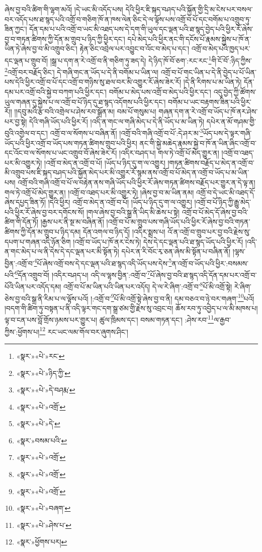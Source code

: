 ཞེས་བྱ་བའི་ཚིག་གི་ལྷག་མའོ། །དེ་ཡང་མི་འདོད་པས། དེའི་ཕྱིར་ཇི་སྐད་བཤད་པའི་སྐྱོན་གྱི་དྲི་མ་ངེས་པར་བསལ་བར་འདོད་པས་ཐ་སྙད་པའི་འགྲོ་བ་གཅིག་ཁོ་ན་ཁས་ལེན་ཅིང་དེ་ལ་ལྟོས་པས་འགྲོ་བ་པོ་དང་བགོམ་པ་འགྲུབ་ཏུ་ཟིན་ཀྱང་། དོན་དམ་པ་པའི་འགྲོ་བ་ཡང་མི་འཐད་པས་དེ་དག་གི་ཡུལ་དང་ལྡན་པའི་ཐ་སྙད་བྱེད་པའི་ཕྱིར་རོ་ཞེས་བྱ་བ་གཏན་ཚིགས་ཀྱི་དོན་མ་གྲུབ་པ་ཉིད་ཀྱི་ཕྱིར་དང་། དཔེ་མེད་པའི་ཕྱིར་ནང་གི་དངོས་པོ་རྣམས་སྐྱེས་པ་ཁོ་ན་ཡིན་ཏེ་ཞེས་བྱ་བ་མི་འགྲུབ་ཅིང་། རྟེན་ཅིང་འབྲེལ་པར་འབྱུང་བ་འོང་བ་མེད་པ་དང་། འགྲོ་བ་མེད་པའི་ཁྱད་པར་དང་ལྡན་པ་གྲུབ་བོ། །སྒྲ་པ་དག་ན་རེ་འགྲོ་བ་ནི་གཅིག་ཏུ་ཟད་དེ། དེ་ཉིད་ཁོ་བོ་ཅག་:རང་རང་\footnote{«སྣར་»«པེ་»རང་}གི་ངོ་བོ་:ཉིད་ཀྱིས་\footnote{«སྣར་»«པེ་»ཉིད་ཀྱི་}འགྲོ་བར་བརྗོད་ཅིང་། དེ་གཞི་གང་ན་ཡོད་པ་དེ་ནི་བགོམ་པ་ཡིན་ལ། འགྲོ་བ་པོ་གང་ཡིན་པ་དེ་ནི་བྱེད་པ་པོ་ཡིན་པས་དེའི་ཕྱིར་འགྲོ་བ་པོ་དང་འགྲོ་བ་གཉིས་སུ་ཐལ་བར་མི་འགྱུར་རོ་ཞེས་ཟེར་རོ། །དེ་ནི་རིགས་པ་མ་ཡིན་ཏེ། དོན་དམ་པར་འགྲོ་བའི་སྐྱེ་བ་བཀག་པའི་ཕྱིར་དང་། བགོམ་པ་མེད་པས་འགྲོ་བ་མེད་པའི་ཕྱིར་དང་། འདུ་བྱེད་ཀྱི་ཚོགས་ཡུལ་གཞན་དུ་སྐྱེས་པ་ལ་འགྲོ་བ་པོ་ཉིད་དུ་ཐ་སྙད་འདོགས་པའི་ཕྱིར་དང་། བགོམ་པ་ཡང་བརྟགས་ཟིན་པའི་ཕྱིར་རོ།། །།དབུ་མའི་རྩ་བའི་འགྲེལ་པ་ཤེས་རབ་སྒྲོན་མ། བམ་པོ་གསུམ་པ། གཞན་དག་ན་རེ་འགྲོ་བ་ཡོད་པ་ཁོ་ནར་ཤེས་པར་བྱ་སྟེ། དེའི་གཞི་ཡོད་པའི་ཕྱིར་རོ། །འདི་ན་གང་ལ་གཞི་མེད་པ་དེ་ནི་ཡོད་པ་མ་ཡིན་ཏེ། དཔེར་ན་མོ་གཤམ་གྱི་བུའི་འགྱེལ་བ་དང་། འགྲོ་བ་ལ་སོགས་པ་བཞིན་ནོ། །འགྲོ་བའི་གཞི་འགྲོ་བ་པོ་:དེ་ཤར་མ་\footnote{«སྣར་»«པེ་»དེ་བཤརྨ་}ཡོད་པས་དེ་ལྟར་གཞི་ཡོད་པའི་ཕྱིར་འགྲོ་བ་ཡོད་པས་གཏན་ཚིགས་གྲུབ་པའི་ཕྱིར། ནང་གི་སྐྱེ་མཆེད་རྣམས་སྐྱེ་བ་ཁོ་ན་ཡིན་ཞིང་འགྲོ་བ་དང་འོང་བ་ལ་སོགས་པ་ཡང་འགྲུབ་བོ་ཞེས་ཟེར་རོ། །འདིར་བཤད་པ། གལ་ཏེ་འགྲོ་པོ་མེད་གྱུར་ན། །འགྲོ་བ་འཐད་པར་མི་འགྱུར་ཏེ། །འགྲོ་བ་མེད་ན་འགྲོ་བ་པོ། །ཡོད་པ་ཉིད་དུ་ག་ལ་འགྱུར། །གཏན་ཚིགས་བརྗོད་པ་མེད་ན་འགྲོ་བ་མི་འགྲུབ་པས་ཇི་སྐད་བཤད་པའི་སྐྱོན་མེད་པར་མི་འགྱུར་རོ་སྙམ་ནས་འགྲོ་བ་པོ་མེད་ན་འགྲོ་བ་ཡོད་པ་མ་ཡིན་པས། འགྲོ་བའི་གཞི་འགྲོ་བ་པོ་ལ་བརྟེན་ནས་གཞི་ཡོད་པའི་ཕྱིར་རོ་ཞེས་གཏན་ཚིགས་བརྗོད་པར་གྱུར་ན་དེ་ལྟ་ན། གལ་ཏེ་འགྲོ་པོ་མེད་གྱུར་ན། །འགྲོ་བ་འཐད་པར་མི་འགྱུར་ཏེ། །ཞེས་བྱ་བ་མ་ཡིན་ནམ། འགྲོ་བ་དེ་ཡང་མི་འཐད་དོ་ཞེས་དཔྱད་ཟིན་ཏོ། །དེའི་ཕྱིར། འགྲོ་བ་མེད་ན་འགྲོ་བ་པོ། །ཡོད་པ་ཉིད་དུ་ག་ལ་འགྱུར། །འགྲོ་བ་པོ་ཉིད་ཀྱི་རྒྱུ་མེད་པའི་ཕྱིར་རོ་ཞེས་བྱ་བར་དགོངས་སོ། །གལ་ཞེས་བྱ་བའི་སྒྲ་ནི་ཡིད་མི་ཆེས་པ་སྟེ། འགྲོ་བ་པོ་མེད་དོ་ཞེས་བྱ་བའི་ཚིག་གི་དོན་ཏོ། །རྒྱས་པར་ནི་སྔ་མ་བཞིན་ནོ། །འགྲོ་བ་པོ་མ་གྲུབ་པས་གཞི་ཡོད་པའི་ཕྱིར་རོ་ཞེས་བྱ་བའི་གཏན་ཚིགས་ཀྱི་དོན་མ་གྲུབ་པ་ཉིད་དམ། དོན་འགལ་བ་ཉིད་དོ། །འདིར་སྨྲས་པ། འོ་ན་འགྲོ་བ་གྲུབ་པར་བྱ་བའི་རྗེས་སུ་དཔག་པ་གཞན་འདི་ཉོན་ཅིག །འགྲོ་བ་ཡོད་པ་ཁོ་ནར་ངེས་ཏེ། དེས་དེ་དང་ལྡན་པའི་ཐ་སྙད་ཡོད་པའི་ཕྱིར་རོ། །འདི་ན་གང་མེད་པ་ལ་ནི་དེས་དེ་དང་ལྡན་པར་མི་སྟོན་ཏེ། དཔེར་ན་རི་བོང་རྭ་ཅན་ཞེས་མི་སྟོན་པ་བཞིན་ནོ། །ལྷས་བྱིན་:འགྲོ་བ་\footnote{«སྣར་»«པེ་»འགྲོ་}པོ་ཞེས་འགྲོ་བས་དེ་དང་ལྡན་པའི་ཐ་སྙད་འདི་ཡོད་པས་དེས་\footnote{«སྣར་»«པེ་»དེ་}ན་འགྲོ་བ་ཡོད་པའི་ཕྱིར་:བསམས་པའི་\footnote{«སྣར་»བསམ་པའི་}དོན་འགྲུབ་བོ། །འདིར་བཤད་པ། འདི་ལ་ལྷས་བྱིན་:འགྲོ་བ་\footnote{«སྣར་»«པེ་»འགྲོ་}པོ་ཞེས་བྱ་བའི་ཐ་སྙད་འདི་དོན་དམ་པར་འགྲོ་བ་པོའི་ཡིན་པར་འདོད་དམ། འགྲོ་བ་པོ་མ་ཡིན་པའི་ཡིན་པར་འདོད། དེ་ལ་རེ་ཞིག་:འགྲོ་བ་\footnote{«སྣར་»«པེ་»འགྲོ་}པོ་མི་འགྲོ་སྟེ། རེ་ཞིག་ཅེས་བྱ་བའི་སྒྲ་ནི་རིམ་པ་ལ་ལྟོས་པའོ། །:འགྲོ་བ་\footnote{«སྣར་»«པེ་»འགྲོ་}པོ་མི་འགྲོ་སྟེ་ཞེས་བྱ་བ་ནི། དམ་བཅའ་བ་ཉེ་བར་གཞག་\footnote{«སྣར་»«པེ་»བཞག་}པའོ། །བདག་གི་ཚིག་ཏུ་བསྟན་པ་ནི་འདི་ལྟར་གང་དག་སྒྲ་ཙམ་གྱི་རྗེས་སུ་འབྲང་བ། ཆོས་རབ་ཏུ་འབྱེད་པ་ལ་མི་མཁས་པ། ལྟ་བ་ངན་པས་བློ་གྲོས་ཉམས་པར་གྱུར་པ། ཚུལ་ཁྲིམས་དང་། བསམ་གཏན་དང་། :ཤེས་རབ་\footnote{«སྣར་»«པེ་»ཤེས་པ་}ལ་རྒྱབ་ཀྱིས་:ཕྱོགས་པ།\footnote{«སྣར་»ཕྱོགས་པར།} རང་ཡང་ལམ་གོལ་བར་ཞུགས་ཤིང་། 